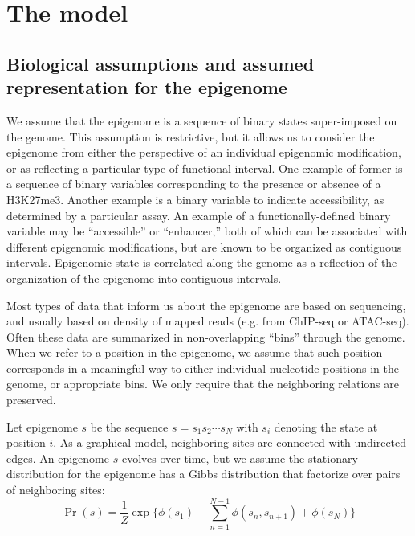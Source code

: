 \documentclass[11pt]{article}
\begin{document}
\section{The model}

\subsection{Biological assumptions and assumed representation for the epigenome}
\label{biodefs}

We assume that the epigenome is a sequence of binary states
super-imposed on the genome. This assumption is restrictive, but it
allows us to consider the epigenome from either the perspective of an
individual epigenomic modification, or as reflecting a particular type
of functional interval. One example of former is a sequence of binary
variables corresponding to the presence or absence of a H3K27me3.
Another example is a binary variable to indicate accessibility, as
determined by a particular assay. An example of a functionally-defined
binary variable may be ``accessible'' or ``enhancer,'' both of which
can be associated with different epigenomic modifications, but are
known to be organized as contiguous intervals. Epigenomic state is
correlated along the genome as a reflection of the organization of the
epigenome into contiguous intervals.

Most types of data that inform us about the epigenome are based on
sequencing, and usually based on density of mapped reads (e.g. from
ChIP-seq or ATAC-seq). Often these data are summarized in
non-overlapping ``bins'' through the genome. When we refer to a
position in the epigenome, we assume that such position corresponds in
a meaningful way to either individual nucleotide positions
in the genome, or appropriate bins. We only require that the
neighboring relations are preserved.

Let epigenome $s$ be the sequence $s=s_1s_2\cdots s_N$ with $s_i$
denoting the state at position $i$.
As a graphical model, neighboring sites are connected with undirected
edges. An epigenome $s$ evolves over time, but we assume the
stationary distribution for the epigenome has a Gibbs distribution
that factorize over pairs of neighboring sites:
\begin{equation}\label{eqn:stationary}
  \Pr(s) = \frac{1}{Z} \exp\big\{\phi(s_1) +\sum_{n=1}^{N-1}\phi(s_n, s_{n+1}) + \phi(s_N)\big\}
\end{equation}
\end{document}
